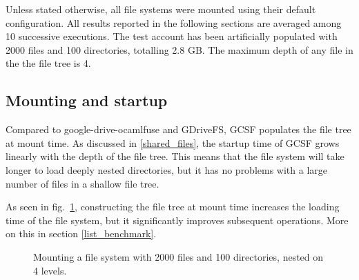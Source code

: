 Unless stated otherwise, all file systems were mounted using their default configuration. All results reported in the following sections are averaged among 10 successive executions. The test account has been artificially populated with 2000 files and 100 directories, totalling 2.8 GB. The maximum depth of any file in the the file tree is 4.

\subsection{Mounting and startup}

Compared to google-drive-ocamlfuse and GDriveFS, GCSF populates the file tree at mount time. As discussed in \ref{shared_files}, the startup time of GCSF grows linearly with the depth of the file tree. This means that the file system will take longer to load deeply nested directories, but it has no problems with a large number of files in a shallow file tree.

As seen in fig.~\ref{fig:mount_benchmark}, constructing the file tree at mount time increases the loading time of the file system, but it significantly improves subsequent operations. More on this in section \ref{list_benchmark}.


\begin{figure}[bpt]
\centering
{}
\caption{Mounting a file system with 2000 files and 100 directories, nested on 4 levels.}
\label{fig:mount_benchmark}
\end{figure}


